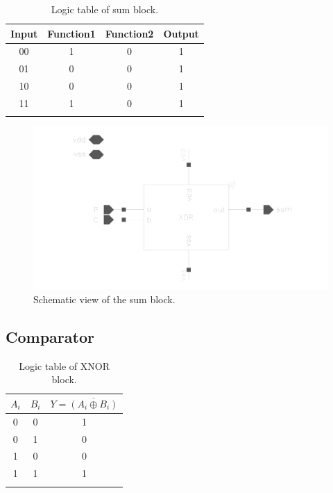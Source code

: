 \begin{table}[H]
  \caption{Logic table of sum block.}
  \centering
  \begin{tabular}{cccc}
    \toprule
    Input & Function1 & Function2 & Output \\
    \midrule
    00 & 1 & 0& 1\\
    01 & 0 & 0 & 1\\
    10 & 0 & 0 & 1\\
    11 & 1 & 0 & 1\\
    \bottomrule
    \label{tab:sum}
  \end{tabular}
\end{table}

\begin{figure}[H]
  \centering
  \captionsetup{justification=centering}
  \includegraphics[clip,width=1.0\textwidth]{../figures/sum}
  \caption{Schematic view of the sum block.} \label{fig:sum}
\end{figure}

\subsection{Comparator}
\begin{table}[H]
  \caption{Logic table of XNOR block.}
  \centering
  \begin{tabular}{cc|c}
    \toprule
    $A_i$ & $B_i$ & $Y = \overline{(A_i \oplus B_i)}$ \\
    \midrule
    0 & 0 & 1 \\
    0 & 1 & 0 \\
    1 & 0 & 0 \\
    1 & 1 & 1 \\
    \bottomrule
    \label{tab:xnor}
  \end{tabular}
\end{table}
